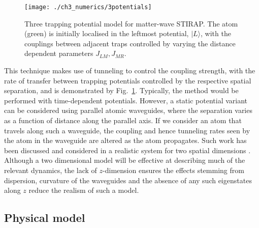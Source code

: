\begin{figure}
    \centering
    \texttt{[image: ./ch3\_numerics/3potentials]}
    \caption{Three trapping potential model for matter-wave STIRAP. The atom (green) is initially localised in the leftmost potential, $|L\rangle$, with the couplings between adjacent traps controlled by varying the distance dependent parameters $J_{LM},J_{MR}$.}
    \label{fig:ch3_stirap}
\end{figure}

This technique makes use of tunneling to control the coupling strength, with the rate of transfer between trapping potentials controlled by the respective spatial separation, and is demonstrated by Fig.~\ref{fig:ch3_stirap}. Typically, the method would be performed with time-dependent potentials. However, a static potential variant can be considered using parallel atomic waveguides, where the separation varies as a function of distance along the parallel axis. If we consider an atom that travels along such a waveguide, the coupling and hence tunneling rates seen by the atom in the waveguide are altered as the atom propagates. Such work has been discussed and considered in a realistic system for two spatial dimensions \cite{OSullivan:10}. Although a two dimensional model will be effective at describing much of the relevant dynamics, the lack of $z$-dimension ensures the effects stemming from dispersion, curvature of the waveguides and the absence of any such eigenstates along $z$ reduce the realism of such a model.

\subsection{Physical model}

